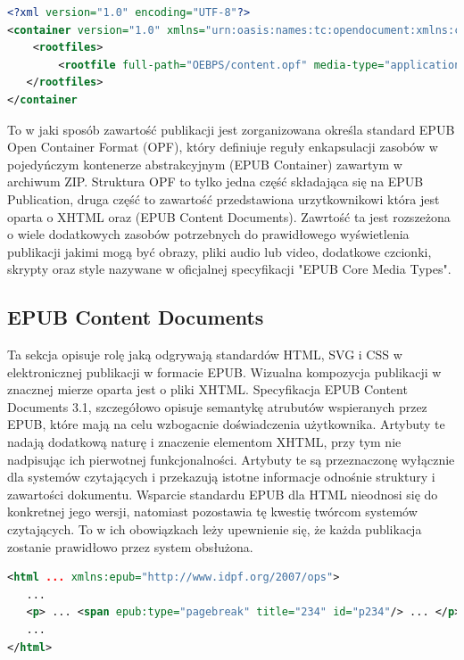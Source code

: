 \begin{lstlisting}[caption={Przykładowy plik container.xml}, language=XML]
<?xml version="1.0" encoding="UTF-8"?>
<container version="1.0" xmlns="urn:oasis:names:tc:opendocument:xmlns:container">
    <rootfiles>
        <rootfile full-path="OEBPS/content.opf" media-type="application/oebps-package+xml"/>
   </rootfiles>
</container
\end{lstlisting}

To w jaki sposób zawartość publikacji jest zorganizowana określa standard EPUB Open Container Format (OPF), który definiuje reguły
enkapsulacji zasobów w pojedyńczym kontenerze abstrakcyjnym (EPUB Container) zawartym w archiwum ZIP. Struktura OPF to tylko jedna część
składająca się na EPUB Publication, druga część to zawartość przedstawiona urzytkownikowi która jest oparta o XHTML oraz (EPUB Content
Documents). Zawrtość ta jest rozszeżona o wiele dodatkowych zasobów potrzebnych do prawidłowego wyświetlenia publikacji jakimi mogą być
obrazy, pliki audio lub video, dodatkowe czcionki, skrypty oraz style nazywane w oficjalnej specyfikacji "EPUB Core Media Types".

\subsection{EPUB Content Documents}

Ta sekcja opisuje rolę jaką odgrywają standardów HTML, SVG i CSS w elektronicznej publikacji w formacie EPUB.
Wizualna kompozycja publikacji w znacznej mierze oparta jest o pliki XHTML. Specyfikacja EPUB Content Documents 3.1, szczegółowo opisuje
semantykę atrubutów wspieranych przez EPUB, które mają na celu wzbogacnie doświadczenia użytkownika. Artybuty te nadają dodatkową naturę
i znaczenie elementom XHTML, przy tym nie nadpisując ich pierwotnej funkcjonalności. Artybuty te są przeznaczonę wyłącznie dla systemów
czytających i przekazują istotne informacje odnośnie struktury i zawartości dokumentu.
Wsparcie standardu EPUB dla HTML nieodnosi się do konkretnej jego wersji, natomiast pozostawia tę kwestię twórcom systemów czytających.
To w ich obowiązkach leży upewnienie się, że każda publikacja zostanie prawidłowo przez system obsłużona.

\begin{lstlisting}[float=h, caption={Przykładowe wykorzystanie atrybutu epub:type aby oznaczyć zakończenie linii.\protect\cite{EPUBContentDocumentsSpecificationXML}}, language=XML]
<html ... xmlns:epub="http://www.idpf.org/2007/ops">
   ...
   <p> ... <span epub:type="pagebreak" title="234" id="p234"/> ... </p>
   ...
</html>
\end{lstlisting}

